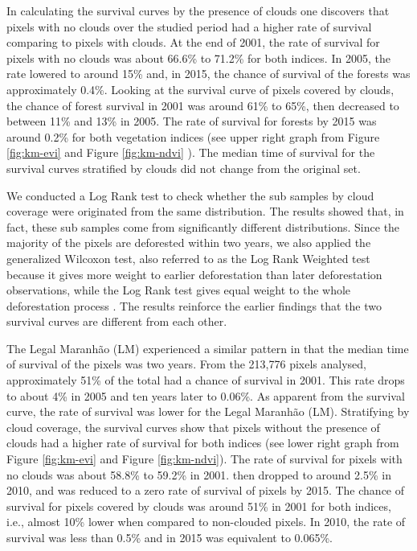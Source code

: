 
In calculating the survival curves by the presence of clouds one discovers that pixels with no clouds over the studied period had a higher rate of survival comparing to pixels with clouds. At the end of 2001, the rate of survival for pixels with no clouds was about 66.6\% to 71.2\% for both indices. In 2005, the rate lowered to around 15\% and, in 2015, the chance of survival of the forests was approximately 0.4\%. Looking at the survival curve of pixels covered by clouds, the chance of forest survival in 2001 was around 61\% to 65\%, then decreased to between 11\% and 13\% in 2005. The rate of survival for forests by 2015 was around 0.2\% for both vegetation indices (see upper right graph from Figure \ref{fig:km-evi} and Figure \ref{fig:km-ndvi} ). The median time of survival for the survival curves stratified by clouds did not change from the original set. 


We conducted a Log Rank test \citep{Peto_1972} to check whether the sub samples by cloud coverage were originated from the same distribution. The results showed that, in fact, these sub samples come from significantly different distributions. Since the majority of the pixels are deforested within two years, we also applied the generalized Wilcoxon test, also referred to as the Log Rank Weighted test because it gives more weight to earlier deforestation than later deforestation observations, while the Log Rank test gives equal weight to the whole deforestation process \citep{lee_wang_2003}. The results reinforce the earlier findings that the two survival curves are different from each other.

The Legal Maranhão (LM) experienced a similar pattern in that the median time of survival of the pixels was two years. From the 213,776 pixels analysed, approximately 51\% of the total had a chance of survival in 2001. This rate drops to about 4\% in 2005 and ten years later to 0.06\%. As apparent from the survival curve, the rate of survival was lower for the Legal Maranhão (LM). Stratifying by cloud coverage, the survival curves show that pixels without the presence of clouds had a higher rate of survival for both indices (see lower right graph from Figure \ref{fig:km-evi} and Figure \ref{fig:km-ndvi}). The rate of survival for pixels with no clouds was about 58.8\% to 59.2\% in 2001. then dropped to around 2.5\% in 2010, and was reduced to a zero rate of survival of pixels by 2015. The chance of survival for pixels covered by clouds was around 51\% in 2001 for both indices, i.e., almost 10\% lower when compared to non-clouded pixels. In 2010, the rate of survival was less than 0.5\% and in 2015 was equivalent to 0.065\%. 

